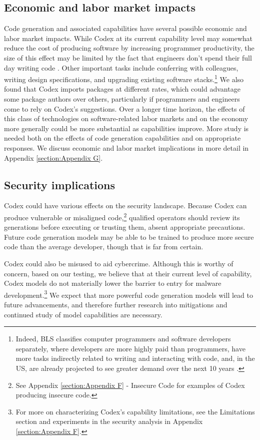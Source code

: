 \subsection{Economic and labor market impacts}
\label{sec:impacts:economy}
Code generation and associated capabilities have several possible economic and labor market impacts. While Codex at its current capability level may somewhat reduce the cost of producing software by increasing programmer productivity, the size of this effect may be limited by the fact that engineers don’t spend their full day writing code \citep{onetsoftwaredevelopers}. Other important tasks include conferring with colleagues, writing design specifications, and upgrading existing software stacks.\footnote{Indeed, BLS classifies computer programmers and software developers separately, where developers are more highly paid than programmers, have more tasks indirectly related to writing and interacting with code, and, in the US, are already projected to see greater demand over the next 10 years \citep{li2020distinguishes, blscomputerprogrammers, blssoftwaredevelopers}.} We also found that Codex imports packages at different rates, which could advantage some package authors over others, particularly if programmers and engineers come to rely on Codex's suggestions. Over a longer time horizon, the effects of this class of technologies on software-related labor markets and on the economy more generally could be more substantial as capabilities improve. More study is needed both on the effects of code generation capabilities and on appropriate responses. We discuss economic and labor market implications in more detail in Appendix \ref{section:Appendix G}. 

\subsection{Security implications}
\label{sec:impacts:security}
Codex could have various effects on the security landscape. Because Codex can produce vulnerable or misaligned code,\footnote{See Appendix \ref{section:Appendix F} - Insecure Code for examples of Codex producing insecure code.} qualified operators should review its generations before executing or trusting them, absent appropriate precautions. Future code generation models may be able to be trained to produce more secure code than the average developer, though that is far from certain.

Codex could also be misused to aid cybercrime. Although this is worthy of concern, based on our testing, we believe that at their current level of capability, Codex models do not materially lower the barrier to entry for malware development.\footnote{For more on characterizing Codex’s capability limitations, see the Limitations section and experiments in the security analysis in Appendix \ref{section:Appendix F}.}  We expect that more powerful code generation models will lead to future advancements, and therefore further research into mitigations and continued study of model capabilities are necessary.

